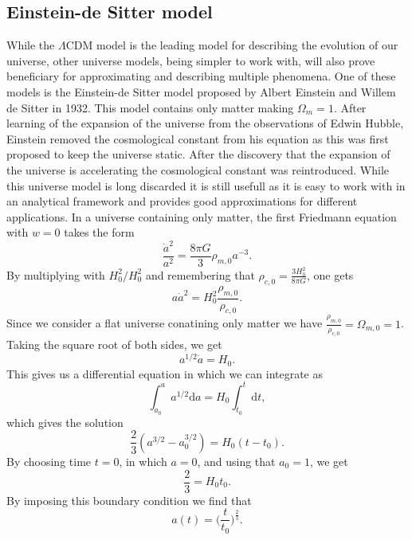 \subsection{Einstein-de Sitter model}
While the $\Lambda$CDM model is the leading model for describing the evolution
of our universe, other universe models, being simpler to work with, will also
prove beneficiary for approximating and describing multiple phenomena. One of
these models is the Einstein-de Sitter model \cite{1932PNAS...18..213E} proposed
by Albert Einstein and Willem de Sitter in 1932. This model contains only matter
making $\Omega_m=1$. After learning of the expansion
of the universe from the observations of Edwin Hubble, Einstein removed the
cosmological constant from his equation as this was first proposed to keep the
universe static. After the discovery that the expansion of the universe is
accelerating \cite{Goldhaber_2009}\cite{Filippenko_1998} the cosmological
constant was reintroduced. While this universe model is long discarded it is
still usefull as it is easy to work with in an analytical framework and provides
good approximations for different applications. In a universe containing only
matter, the first Friedmann equation with $w=0$ takes the form
\begin{equation}
    \frac{\dot{a}^2}{a^2} = \frac{8\pi G}{3}\rho_{m,0}a^{-3}.
\end{equation}
By multiplying with $H_0^2/H_0^2$ and remembering that $\rho_{c,0}=\frac{3H_0^2}{8\pi
G}$, one gets
\begin{equation}
    a\dot{a}^2=H_0^2\frac{\rho_{m,0}}{\rho_{c,0}}.
\end{equation}
Since we consider a flat universe conatining only matter we have
$\frac{\rho_{m,0}}{\rho_{c,0}}=\Omega_{m,0}=1$. Taking the square root of both
sides, we get
\begin{equation}
    a^{1/2}\dot{a}=H_0.
\end{equation}
This gives us a differential equation in which we can integrate as
\begin{equation}
    \int_{a_0}^a a^{1/2}\mathrm{d}a=H_0\int_{t_0}^t \mathrm{d}t,
\end{equation}
which gives the solution
\begin{equation}
    \frac{2}{3}(a^{3/2}-a_0^{3/2})=H_0(t-t_0).
\end{equation}
By choosing time $t=0$, in which $a=0$, and using that $a_0=1$, we get
\begin{equation}
    \frac{2}{3}=H_0t_0.
\end{equation}
By imposing this boundary condition we find that
\begin{equation}
    a(t)=\Big(\frac{t}{t_0}\Big)^\frac{2}{3}.
\end{equation}

